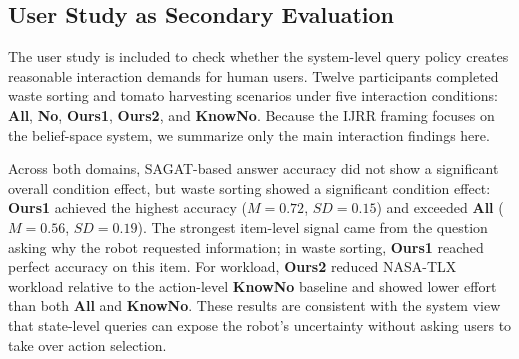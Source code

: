 \subsection{User Study as Secondary Evaluation}
\label{sec:user_study}

The user study is included to check whether the system-level query policy creates reasonable interaction demands for human users. Twelve participants completed waste sorting and tomato harvesting scenarios under five interaction conditions: \textbf{All}, \textbf{No}, \textbf{Ours1}, \textbf{Ours2}, and \textbf{KnowNo}. Because the IJRR framing focuses on the belief-space system, we summarize only the main interaction findings here.

Across both domains, SAGAT-based answer accuracy did not show a significant overall condition effect, but waste sorting showed a significant condition effect: \textbf{Ours1} achieved the highest accuracy ($M=0.72$, $SD=0.15$) and exceeded \textbf{All} ($M=0.56$, $SD=0.19$). The strongest item-level signal came from the question asking why the robot requested information; in waste sorting, \textbf{Ours1} reached perfect accuracy on this item. For workload, \textbf{Ours2} reduced NASA-TLX workload relative to the action-level \textbf{KnowNo} baseline and showed lower effort than both \textbf{All} and \textbf{KnowNo}. These results are consistent with the system view that state-level queries can expose the robot's uncertainty without asking users to take over action selection.
